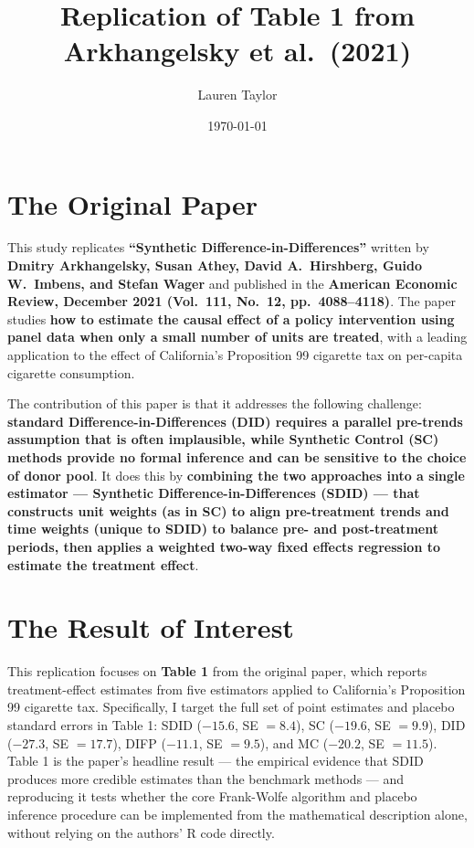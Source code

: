 \documentclass[12pt]{article}
\title{Replication of Table 1 from Arkhangelsky et al.\ (2021)}
\author{Lauren Taylor}
\date{\today}
\begin{document}
\maketitle

\section{The Original Paper}

This study replicates \textbf{``Synthetic Difference-in-Differences''} written by
\textbf{Dmitry Arkhangelsky, Susan Athey, David A.\ Hirshberg, Guido W.\ Imbens,
and Stefan Wager} and published in the \textbf{American Economic Review, December 2021
(Vol.\ 111, No.\ 12, pp.\ 4088--4118)}.
The paper studies \textbf{how to estimate the causal effect of a policy intervention
using panel data when only a small number of units are treated},
with a leading application to the effect of California's Proposition 99
cigarette tax on per-capita cigarette consumption.

The contribution of this paper is that it addresses the following challenge:
\textbf{standard Difference-in-Differences (DID) requires a parallel pre-trends
assumption that is often implausible, while Synthetic Control (SC) methods
provide no formal inference and can be sensitive to the choice of donor pool}.
It does this by \textbf{combining the two approaches into a single estimator ---
Synthetic Difference-in-Differences (SDID) --- that constructs unit weights
(as in SC) to align pre-treatment trends and time weights (unique to SDID)
to balance pre- and post-treatment periods, then applies a weighted two-way
fixed effects regression to estimate the treatment effect}.

\section{The Result of Interest}

This replication focuses on \textbf{Table 1} from the original paper, which reports
treatment-effect estimates from five estimators applied to California's Proposition 99
cigarette tax.
Specifically, I target the full set of point estimates and placebo standard errors in
Table 1: SDID ($-15.6$, SE $= 8.4$), SC ($-19.6$, SE $= 9.9$), DID ($-27.3$, SE $= 17.7$),
DIFP ($-11.1$, SE $= 9.5$), and MC ($-20.2$, SE $= 11.5$).
Table 1 is the paper's headline result --- the empirical evidence that SDID produces
more credible estimates than the benchmark methods --- and reproducing it tests
whether the core Frank-Wolfe algorithm and placebo inference procedure can be implemented
from the mathematical description alone, without relying on the authors' R code directly.
\end{document}
